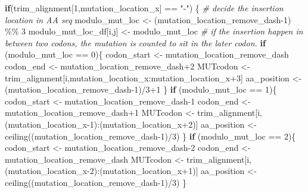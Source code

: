 \documentclass[
]{article}
\newenvironment{Shaded}{\begin{snugshade}}{\end{snugshade}}
\newcommand{\CommentTok}[1]{\textcolor[rgb]{0.56,0.35,0.01}{\textit{#1}}}
\newcommand{\ControlFlowTok}[1]{\textcolor[rgb]{0.13,0.29,0.53}{\textbf{#1}}}
\newcommand{\DecValTok}[1]{\textcolor[rgb]{0.00,0.00,0.81}{#1}}
\newcommand{\FunctionTok}[1]{\textcolor[rgb]{0.00,0.00,0.00}{#1}}
\newcommand{\NormalTok}[1]{#1}
\newcommand{\OtherTok}[1]{\textcolor[rgb]{0.56,0.35,0.01}{#1}}
\newcommand{\SpecialCharTok}[1]{\textcolor[rgb]{0.00,0.00,0.00}{#1}}
\newcommand{\StringTok}[1]{\textcolor[rgb]{0.31,0.60,0.02}{#1}}
\begin{document}
\begin{Shaded}
\begin{Highlighting}[]
      \ControlFlowTok{if}\NormalTok{(trim\_alignment[}\DecValTok{1}\NormalTok{,mutation\_location\_x] }\SpecialCharTok{==} \StringTok{"{-}"}\NormalTok{)}
\NormalTok{      \{}
        \CommentTok{\# decide the insertion location in AA seq}
\NormalTok{        modulo\_mut\_loc }\OtherTok{\textless{}{-}}\NormalTok{ (mutation\_location\_remove\_dash}\DecValTok{{-}1}\NormalTok{) }\SpecialCharTok{\%\%} \DecValTok{3}
\NormalTok{        modulo\_mut\_loc\_df[i,j] }\OtherTok{\textless{}{-}}\NormalTok{ modulo\_mut\_loc}
        \CommentTok{\# if the insertion happen in between two codons, the mutation is counted to sit in the later codon.  }
        \ControlFlowTok{if}\NormalTok{ (modulo\_mut\_loc }\SpecialCharTok{==} \DecValTok{0}\NormalTok{)\{}
\NormalTok{          codon\_start }\OtherTok{\textless{}{-}}\NormalTok{ mutation\_location\_remove\_dash}
\NormalTok{          codon\_end }\OtherTok{\textless{}{-}}\NormalTok{ mutation\_location\_remove\_dash}\SpecialCharTok{+}\DecValTok{2}
\NormalTok{          MUTcodon }\OtherTok{\textless{}{-}}\NormalTok{ trim\_alignment[i,mutation\_location\_x}\SpecialCharTok{:}\NormalTok{mutation\_location\_x}\SpecialCharTok{+}\DecValTok{3}\NormalTok{]}
\NormalTok{          aa\_position }\OtherTok{\textless{}{-}}\NormalTok{ (mutation\_location\_remove\_dash}\DecValTok{{-}1}\NormalTok{)}\SpecialCharTok{/}\DecValTok{3}\SpecialCharTok{+}\DecValTok{1}
\NormalTok{        \}}
        \ControlFlowTok{if}\NormalTok{ (modulo\_mut\_loc }\SpecialCharTok{==} \DecValTok{1}\NormalTok{)\{}
\NormalTok{          codon\_start }\OtherTok{\textless{}{-}}\NormalTok{ mutation\_location\_remove\_dash}\DecValTok{{-}1}
\NormalTok{          codon\_end }\OtherTok{\textless{}{-}}\NormalTok{ mutation\_location\_remove\_dash}\SpecialCharTok{+}\DecValTok{1}
\NormalTok{          MUTcodon }\OtherTok{\textless{}{-}}\NormalTok{ trim\_alignment[i,(mutation\_location\_x}\DecValTok{{-}1}\NormalTok{)}\SpecialCharTok{:}\NormalTok{(mutation\_location\_x}\SpecialCharTok{+}\DecValTok{2}\NormalTok{)]}
\NormalTok{          aa\_position }\OtherTok{\textless{}{-}} \FunctionTok{ceiling}\NormalTok{((mutation\_location\_remove\_dash}\DecValTok{{-}1}\NormalTok{)}\SpecialCharTok{/}\DecValTok{3}\NormalTok{)}
\NormalTok{        \}}
        \ControlFlowTok{if}\NormalTok{ (modulo\_mut\_loc }\SpecialCharTok{==} \DecValTok{2}\NormalTok{)\{}
\NormalTok{          codon\_start }\OtherTok{\textless{}{-}}\NormalTok{ mutation\_location\_remove\_dash}\DecValTok{{-}2}
\NormalTok{          codon\_end }\OtherTok{\textless{}{-}}\NormalTok{ mutation\_location\_remove\_dash}
\NormalTok{          MUTcodon }\OtherTok{\textless{}{-}}\NormalTok{ trim\_alignment[i,(mutation\_location\_x}\DecValTok{{-}2}\NormalTok{)}\SpecialCharTok{:}\NormalTok{(mutation\_location\_x}\SpecialCharTok{+}\DecValTok{1}\NormalTok{)]}
\NormalTok{          aa\_position }\OtherTok{\textless{}{-}} \FunctionTok{ceiling}\NormalTok{((mutation\_location\_remove\_dash}\DecValTok{{-}1}\NormalTok{)}\SpecialCharTok{/}\DecValTok{3}\NormalTok{)}
\NormalTok{        \}}
        

\end{Highlighting}
\end{Shaded}
\end{document}
